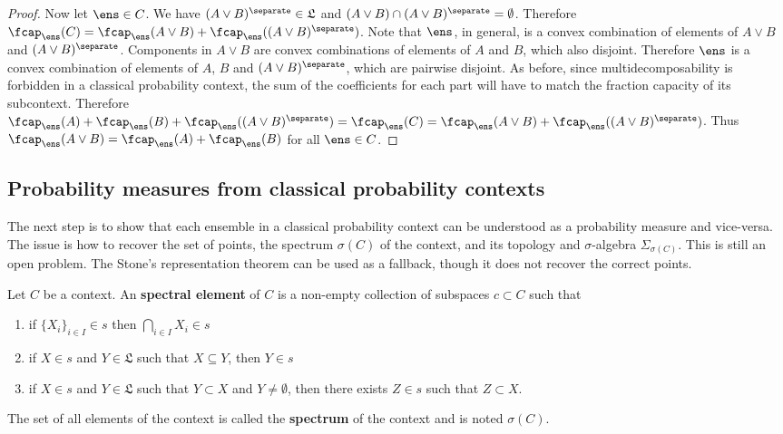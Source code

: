 \begin{proof}
		Now let $\ens \in C$. We have $(A \vee B)^\separate \in \mathfrak{L}$ and $(A \vee B) \cap (A \vee B)^\separate = \emptyset$. Therefore $\fcap_{\ens}(C) = \fcap_{\ens}(A \vee B)+ \fcap_{\ens}((A \vee B)^\separate)$. Note that $\ens$, in general, is a convex combination of elements of $A\vee B$ and $(A \vee B)^\separate$. Components in $A \vee B$ are convex combinations of elements of $A$ and $B$, which also disjoint. Therefore $\ens$ is a convex combination of elements of $A$, $B$ and $(A \vee B)^\separate$, which are pairwise disjoint. As before, since multidecomposability is forbidden in a classical probability context, the sum of the coefficients for each part will have to match the fraction capacity of its subcontext. Therefore $\fcap_{\ens}(A) +  \fcap_{\ens}(B) + \fcap_{\ens}((A \vee B)^\separate) = \fcap_{\ens}(C) = \fcap_{\ens}(A \vee B) + \fcap_{\ens}((A \vee B)^\separate)$. Thus $\fcap_{\ens}(A \vee B) = \fcap_{\ens}(A) +  \fcap_{\ens}(B)$ for all $\ens \in C$.
	\end{proof}


\subsection{Probability measures from classical probability contexts}

The next step is to show that each ensemble in a classical probability context can be understood as a probability measure and vice-versa. The issue is how to recover the set of points, the spectrum $\sigma(C)$ of the context, and its topology and $\sigma$-algebra $\Sigma_{\sigma(C)}$. This is still an open problem. The Stone's representation theorem can be used as a fallback, though it does not recover the correct points.

\begin{defn}
	Let $C$ be a context. An \textbf{spectral element} of $C$ is a non-empty collection of subspaces $c \subset C$ such that
	\begin{enumerate}
		\item if $\{X_i\}_{i \in I} \in s$ then $\bigcap_{i \in I} X_i \in s$
		\item if $X \in s$ and $Y \in \mathfrak{L}$ such that $X \subseteq Y$, then $Y \in s$
		\item if $X \in s$ and $Y \in \mathfrak{L}$ such that $Y \subset X$ and $Y \neq \emptyset$, then there exists $Z \in s$ such that $Z \subset X$.
	\end{enumerate}
	The set of all elements of the context is called the \textbf{spectrum} of the context and is noted $\sigma(C)$.
\end{defn}

